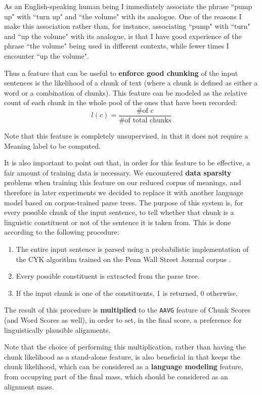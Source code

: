 As an English-speaking human being I immediately associate the phrase ``pump up" with ``turn up" and ``the volume" with its analogue. One of the reasons I make this association rather than, for instance, associating ``pump" with ``turn" and ``up the volume" with its analogue, is that I have good experience of the phrase ``the volume" being used in different contexts, while fewer times I encounter ``up the volume".

Thus a feature that can be useful to \textbf{enforce good chunking} of the input sentences is the likelihood of a chunk of text (where a chunk is defined as either a word or a combination of chunks). This feature can be modeled as the relative count of each chunk in the whole pool of the ones that have been recorded:
$$
l(c)=\frac{\text{\# of }c}{\text{\# of total chunks}}
$$

Note that this feature is completely unsupervised, in that it does not require a Meaning label to be computed.

It is also important to point out that, in order for this feature to be effective, a fair amount of training data is necessary. We encountered \textbf{data sparsity} problems when training this feature on our reduced corpus of meanings, and therefore in later experiments we decided to replace it with another language model based on corpus-trained parse trees. The purpose of this system is, for every possible chunk of the input sentence, to tell whether that chunk is a linguistic constituent or not of the sentence it is taken from. This is done according to the following procedure:
\begin{enumerate}
	\item The entire input sentence is parsed using a probabilistic implementation of the CYK algorithm \citep{conf/tapd/ChappelierR98} trained on the Penn Wall Street Journal corpus \citep{Marcus:1993:BLA:972470.972475}.
	\item Every possible constituent is extracted from the parse tree.
	\item If the input chunk is one of the constituents, 1 is returned, 0 otherwise.
\end{enumerate}
The result of this procedure is \textbf{multiplied} to the \texttt{AAVG} feature of Chunk Scores (and Word Scores as well), in order to set, in the final score, a preference for linguistically plausible alignments.

Note that the choice of performing this multiplication, rather than having the chunk likelihood as a stand-alone feature, is also beneficial in that keeps the chunk likelihood, which can be considered as a \textbf{language modeling} feature, from occupying part of the final mass, which should be considered as an alignment mass.

